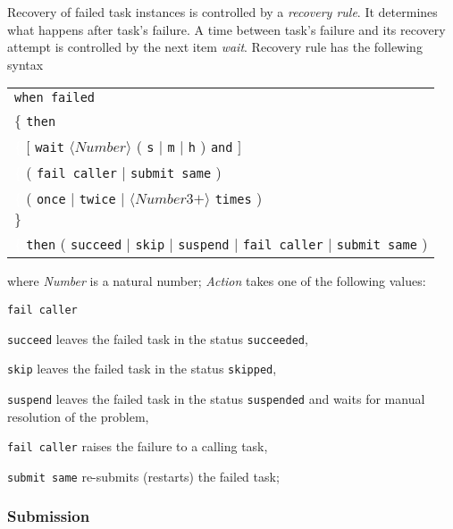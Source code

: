\documentclass[a4paper,12pt,english,oneside]{book}
\begin{document}
Recovery of failed task instances is controlled by a \emph{recovery rule}. It determines what happens after task's failure. A time between task's failure and its recovery attempt is controlled by the next item \emph{wait}. Recovery rule has the follewing syntax
\begin{flushleft}
\begin{tabular}{l}
\verb|when failed|\\
$\{$ \verb|then|\\
\textcolor{white}{$\{$} $[$ \verb|wait| $\langle Number\rangle$ ( \verb|s| $\mid$ \verb|m| $\mid$ \verb|h| ) \verb|and| $]$\\
\textcolor{white}{$\{$} ( \verb|fail caller| $\mid$ \verb|submit same| )\\
\textcolor{white}{$\{$} ( \verb|once| $\mid$ \verb|twice| $\mid$ $\langle\textit{Number3+}\rangle$ \verb|times| )\\
$\}$\\
\textcolor{white}{$\{$} \verb|then| ( \verb|succeed| $\mid$ \verb|skip| $\mid$ \verb|suspend| $\mid$ \verb|fail caller| $\mid$ \verb|submit same| )
\end{tabular}
\end{flushleft}
where \emph{Number} is a natural number;
\emph{Action} takes one of the following values:
\begin{labeling}[ --]{\texttt{fail caller}}
\item [\texttt{succeed}] leaves the failed task in the status \verb|succeeded|,%
%
\item [\texttt{skip}] leaves the failed task in the status \verb|skipped|,%
%
\item [\texttt{suspend}] leaves the failed task in the status \verb|suspended| %
and waits for manual resolution of the problem,
%
\item [\texttt{fail caller}] raises the failure to a calling task,
%
\item [\texttt{submit same}] re-submits (restarts) the failed task;
\end{labeling}

\subsubsection{Submission}
\end{document}
